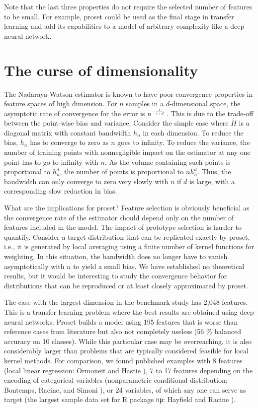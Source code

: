 %
Note that the last three properties do not require the selected number of features to be small.
For example, proset could be used as the final stage in transfer learning and add its capabilities to a model of arbitrary complexity like a deep neural network.
%
\section{The curse of dimensionality}
\label{sec_curse}
%
The Nadaraya-Watson estimator is known to have poor convergence properties in feature spaces of high dimension.
For $n$ samples in a $d$-dimensional space, the asymptotic rate of convergence for the error is $n^{-\frac{4}{4+d}}$ \cite{Haerdle_04}.
This is due to the trade-off between the point-wise bias and variance.
Consider the simple case where $H$ is a diagonal matrix with constant bandwidth $h_n$ in each dimension.
To reduce the bias, $h_n$ has to converge to zero as $n$ goes to infinity.
To reduce the variance, the number of training points with nonnegligible impact on the estimator at any one point has to go to infinity with $n$.
As the volume containing such points is proportional to $h_n^d$, the number of points is proportional to $nh_n^d$.
Thus, the bandwidth can only converge to zero very slowly with $n$ if $d$ is large, with a corresponding slow reduction in bias.\par
%
What are the implications for proset?
Feature selection is obviously beneficial as the convergence rate of the estimator should depend only on the number of features included in the model.
The impact of prototype selection is harder to quantify.
Consider a target distribution that can be replicated exactly by proset, i.e., it is generated by local averaging using a finite number of kernel functions for weighting.
In this situation, the bandwidth does no longer have to vanish asymptotically with $n$ to yield a small bias.
We have established no theoretical results, but it would be interesting to study the convergence behavior for distributions that can be reproduced or at least closely approximated by proset.\par
%
The case with the largest dimension in the benchmark study has 2,048 features.
This is a transfer learning problem where the best results are obtained using deep neural networks.
Proset builds a model using 195 features that is worse than reference cases from literature but also not completely useless (56 \% balanced accuracy on 10 classes).
While this particular case may be overreaching, it is also considerably larger than problems that are typically considered feasible for local kernel methods.
For comparison, we found published examples with 8 features (local linear regression: Ormoneit and Hastie \cite{Ormoneit_99}),
7 to 17 features depending on the encoding of categorical variables (nonparametric conditional distribution: Bontemps, Racine, and Simoni \cite{Bontemps_09}),
or 24 variables, of which any one can serve as target (the largest sample data set for R package \texttt{np}: Hayfield and Racine \cite{Hayfield_08}).
%
